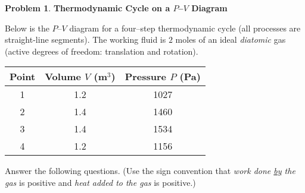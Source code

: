 \documentclass[10pt]{article}
\theoremstyle{definition} %
\newtheorem{problem}{Problem}
\theoremstyle{plain} %
\begin{document}
                                                \begin{problem}
                                                  \textbf{Thermodynamic Cycle on a $P$–$V$ Diagram}
                                                  
                                                  Below is the $P$–$V$ diagram for a four–step thermodynamic cycle (all
                                                  processes are straight-line segments).  
                                                  The working fluid is $2$ moles of an ideal \emph{diatomic} gas
                                                  (active degrees of freedom: translation and rotation).
                                                  
                                                  \medskip
                                                  \begin{center}
                                                  \begin{tabular}{c|c|c}
                                                  \textbf{Point} & \textbf{Volume $V$ (m$^{3}$)} & \textbf{Pressure $P$ (Pa)}\\\hline
                                                  1 & 1.2 & 1027\\
                                                  2 & 1.4 & 1460\\
                                                  3 & 1.4 & 1534\\
                                                  4 & 1.2 & 1156
                                                  \end{tabular}
                                                  \end{center}
                                                  
                                                  \medskip
                                                  Answer the following questions.  (Use the sign convention that \emph{work
                                                  done \underline{by} the gas} is positive and \emph{heat added to the gas}
                                                  is positive.)
                                                  

\end{problem}
\end{document}
